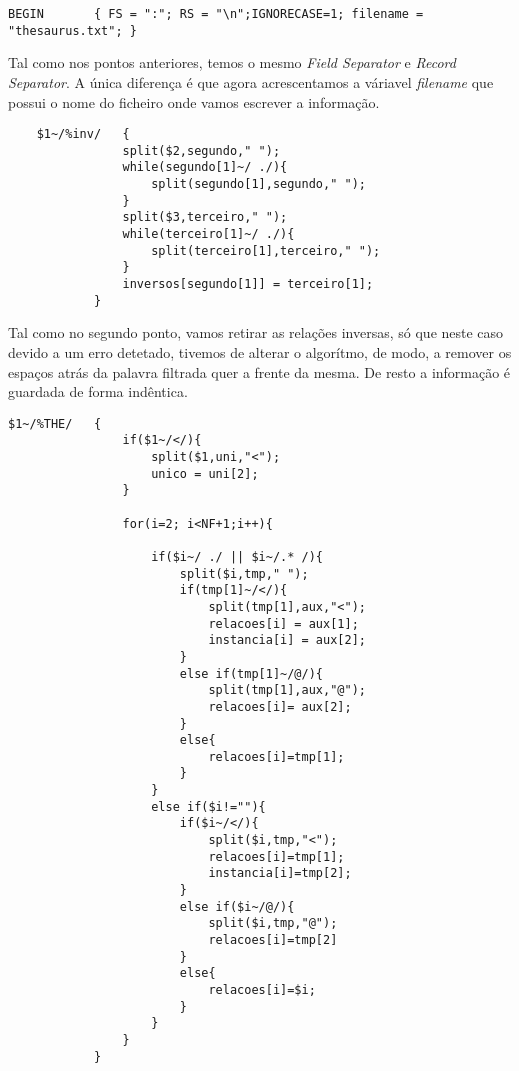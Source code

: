 \documentclass{report}
\begin{document}
\bigskip

\begin{verbatim}
BEGIN       { FS = ":"; RS = "\n";IGNORECASE=1; filename = "thesaurus.txt"; }
\end{verbatim}

    Tal como nos pontos anteriores, temos o mesmo \textit{Field Separator} e \textit{Record Separator}. A única diferença é que agora acrescentamos a váriavel \textit{filename} que possui o nome do ficheiro onde vamos escrever a informação.

\begin{verbatim}
    $1~/%inv/   {
                split($2,segundo," ");
                while(segundo[1]~/ ./){
                    split(segundo[1],segundo," ");
                }
                split($3,terceiro," ");
                while(terceiro[1]~/ ./){
                    split(terceiro[1],terceiro," ");
                }
                inversos[segundo[1]] = terceiro[1]; 
            } 
\end{verbatim}
    
    Tal como no segundo ponto, vamos retirar as relações inversas, só que neste caso devido a um erro detetado, tivemos de alterar o algorítmo, de modo, a remover os espaços atrás da palavra filtrada quer a frente da mesma. De resto a informação é guardada de forma indêntica.

\begin{verbatim}
$1~/%THE/   { 
                if($1~/</){
                    split($1,uni,"<");
                    unico = uni[2];
                }

                for(i=2; i<NF+1;i++){
                    
                    if($i~/ ./ || $i~/.* /){
                        split($i,tmp," ");
                        if(tmp[1]~/</){
                            split(tmp[1],aux,"<");
                            relacoes[i] = aux[1];
                            instancia[i] = aux[2];
                        } 
                        else if(tmp[1]~/@/){
                            split(tmp[1],aux,"@");
                            relacoes[i]= aux[2];
                        }
                        else{
                            relacoes[i]=tmp[1];
                        }
                    }
                    else if($i!=""){
                        if($i~/</){
                            split($i,tmp,"<");
                            relacoes[i]=tmp[1];
                            instancia[i]=tmp[2];
                        }
                        else if($i~/@/){
                            split($i,tmp,"@");
                            relacoes[i]=tmp[2]
                        }
                        else{ 
                            relacoes[i]=$i;
                        }
                    }
                }
            }
\end{verbatim}
\end{document}
